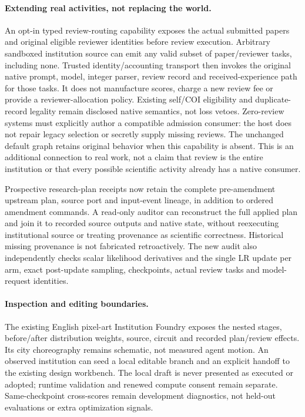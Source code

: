 \paragraph{Extending real activities, not replacing the world.}
An opt-in typed review-routing capability exposes the actual submitted papers
and original eligible reviewer identities before review execution. Arbitrary
sandboxed institution source can emit any valid subset of paper/reviewer tasks,
including none. Trusted identity/accounting transport then invokes the original
native prompt, model, integer parser, review record and received-experience
path for those tasks. It does not manufacture scores, charge a new review fee
or provide a reviewer-allocation policy. Existing self/COI eligibility and
duplicate-record legality remain disclosed native semantics, not loss vetoes.
Zero-review systems must explicitly author a compatible admission consumer:
the host does not repair legacy selection or secretly supply missing reviews.
The unchanged default graph retains original behavior when this capability is
absent. This is an additional connection to real work, not a claim that review
is the entire institution or that every possible scientific activity already
has a native consumer.

Prospective research-plan receipts now retain the complete pre-amendment upstream
plan, source port and input-event lineage, in addition to ordered amendment
commands. A read-only auditor can reconstruct the full applied plan and join it
to recorded source outputs and native state, without reexecuting institutional
source or treating provenance as scientific correctness. Historical missing provenance
is not fabricated retroactively. The new audit also independently checks
scalar likelihood derivatives and the single LR update per arm, exact post-update
sampling, checkpoints, actual review tasks and model-request identities.

\paragraph{Inspection and editing boundaries.}
The existing English pixel-art Institution Foundry exposes the nested stages,
before/after distribution weights, source, circuit and recorded plan/review
effects. Its city choreography remains schematic, not measured agent motion.
An observed institution can seed a local editable branch and an explicit
handoff to the existing design workbench. The local draft is never presented
as executed or adopted; runtime validation and renewed compute consent remain
separate. Same-checkpoint cross-scores remain development diagnostics, not
held-out evaluations or extra optimization signals.

